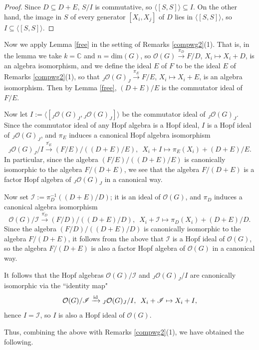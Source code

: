 \documentclass{amsart}
\numberwithin{equation}{section}
\theoremstyle{definition}
\begin{document}
\begin{proof} 
Since $D \subseteq D + E$, $S/I$ is commutative, so $\langle [S,S] \rangle \subseteq I$. On the other hand, the image in $S$ of every generator $[X_i,X_j]$ of $D$ lies in $\langle [S,S]\rangle$, so $I \subseteq  \langle [S,S] \rangle $.
\end{proof}

Now we apply Lemma \ref{free} in the setting of Remarks \ref{compwg2}(1). That is, in the lemma we take $k = \mathbb{C}$ and $n = \mathrm{dim}(G)$, so $\mathcal{O}(G) \xrightarrow{\pi_D}F/D$, $X_i\mapsto X_i+D$, is an algebra isomorphism, and we define the ideal $E$ of $F$ to be the ideal $E$ of Remarks \ref{compwg2}(1), so that ${}_J\mathcal{O}(G)_J \xrightarrow{\pi_E}F/E$, $X_i\mapsto X_i+E$, is an algebra isomorphism. Then by Lemma \ref{free}, $(D +E)/E$ is the commutator ideal of $F/E$. 

Now let $I:=\langle [{}_J\mathcal{O}(G)_J, {}_J\mathcal{O}(G)_J]\rangle$ be the commutator ideal of ${}_J\mathcal{O}(G)_J$. Since the commutator ideal of any Hopf algebra is a Hopf ideal, $I$ is a Hopf ideal of ${}_J\mathcal{O}(G)_J$, and $\pi_E$ induces a canonical Hopf algebra isomorphism  
$${}_J\mathcal{O}(G)_J/I\xrightarrow{\overline{\pi_E}} (F/E)/((D + E)/E),\,\,\,X_i+I\mapsto \pi_E(X_i)+(D + E)/E.$$
In particular, since the algebra $(F/E)/((D + E)/E)$ is canonically isomorphic to the algebra $F/(D + E)$, we see that the algebra $F/(D + E)$ is a factor Hopf algebra of ${}_J\mathcal{O}(G)_J$ in a canonical way. 

Now set $\mathscr{I}:=\pi_D^{-1}\left ((D + E)/D\right )$; it is an ideal of $\mathcal{O}(G)$, and $\pi_D$ induces a canonical algebra isomorphism  
$$\mathcal{O}(G)/\mathscr{I}\xrightarrow{\overline{\pi_D}} (F/D)/((D + E)/D),\,\,\,X_i+\mathscr{I}\mapsto \pi_D(X_i)+(D + E)/D.$$
Since the algebra $(F/D)/((D + E)/D)$ is canonically isomorphic to the algebra $F/(D + E)$, it follows from the above that $\mathscr{I}$ is a Hopf ideal of $\mathcal{O}(G)$, so the algebra $F/(D + E)$ is also a factor Hopf algebra of $\mathcal{O}(G)$ in a canonical way.

It follows that the Hopf algebras $\mathcal{O}(G)/\mathscr{I}$ and ${}_J\mathcal{O}(G)_J/I$ are canonically isomorphic via the ``identity map" 
$$\mathcal{O}(G)/\mathscr{I}\xrightarrow{{\rm id}} {}_J\mathcal{O}(G)_J/I,\,\,\,X_i+\mathscr{I}\mapsto X_i+I,$$
hence $I=\mathscr{I}$, so $I$ is also a Hopf ideal of $\mathcal{O}(G)$.

Thus, combining the above with Remarks \ref{compwg2}(1), we have obtained the following.
\end{document}
